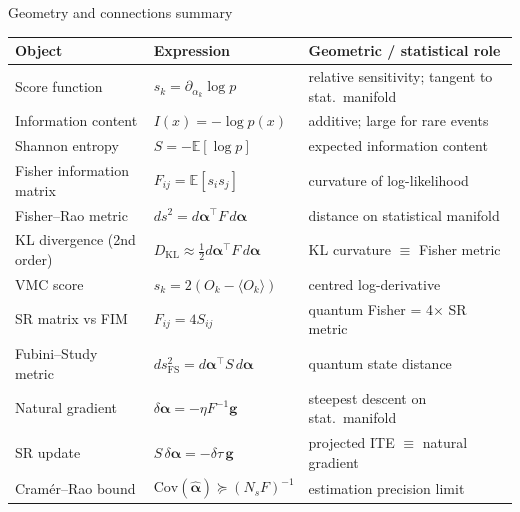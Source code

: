 \documentclass[aspectratio=169]{beamer}
\newcommand{\dkl}{D_{\mathrm{KL}}}
\begin{document}
\begin{frame}{Geometry and connections summary}
\begin{center}
\small
\setlength{\tabcolsep}{5pt}
\begin{tabular}{@{}lll@{}}
\toprule
\textbf{Object} & \textbf{Expression} & \textbf{Geometric / statistical role} \\
\midrule
Score function
  & \(s_k=\partial_{\alpha_k}\log p\)
  & relative sensitivity; tangent to stat.\ manifold \\
Information content
  & \(I(x)=-\log p(x)\)
  & additive; large for rare events \\
Shannon entropy
  & \(S=-\mathbb{E}[\log p]\)
  & expected information content \\
Fisher information matrix
  & \(F_{ij}=\mathbb{E}[s_is_j]\)
  & curvature of log-likelihood \\
Fisher--Rao metric
  & \(ds^2=d\bm{\alpha}^\top F\,d\bm{\alpha}\)
  & distance on statistical manifold \\
KL divergence (2nd order)
  & \(\dkl\approx\tfrac{1}{2}d\bm{\alpha}^\top F\,d\bm{\alpha}\)
  & KL curvature \(\equiv\) Fisher metric \\
VMC score
  & \(s_k=2(O_k-\langle O_k\rangle)\)
  & centred log-derivative \\
SR matrix vs FIM
  & \(F_{ij}=4S_{ij}\)
  & quantum Fisher = 4\(\times\) SR metric \\
Fubini--Study metric
  & \(ds^2_{\mathrm{FS}}=d\bm{\alpha}^\top S\,d\bm{\alpha}\)
  & quantum state distance \\
Natural gradient
  & \(\delta\bm{\alpha}=-\eta F^{-1}\bm{g}\)
  & steepest descent on stat.\ manifold \\
SR update
  & \(S\,\delta\bm{\alpha}=-\delta\tau\,\bm{g}\)
  & projected ITE \(\equiv\) natural gradient \\
Cram\'er--Rao bound
  & \(\mathrm{Cov}(\hat{\bm{\alpha}})\succeq(N_sF)^{-1}\)
  & estimation precision limit \\
\bottomrule
\end{tabular}
\end{center}
\end{frame}

\end{document}
